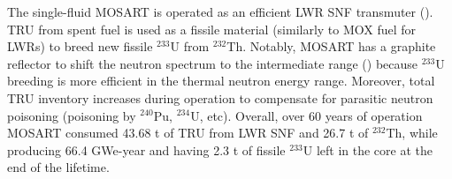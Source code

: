 \documentclass[letterpaper]{mandc2019}
\begin{document}
The single-fluid \gls{MOSART} is operated as an efficient \gls{LWR} \gls{SNF} transmuter (). 
TRU from spent fuel is used as a fissile material (similarly to \gls{MOX} fuel for \gls{LWR}s) to breed new fissile $^{233}$U from $^{232}$Th. 
Notably, \gls{MOSART} has a graphite reflector to shift the neutron spectrum to the  intermediate range () because $^{233}$U breeding is more efficient in the thermal neutron energy range. 
Moreover, total TRU inventory increases  during operation to compensate for parasitic neutron poisoning (poisoning by $^{240}$Pu, $^{234}$U, etc). 
Overall, over 60 years of operation \gls{MOSART} consumed 43.68 t of TRU from \gls{LWR} \gls{SNF} and 26.7 t of $^{232}$Th, while producing 66.4 GWe-year and having 2.3 t of fissile $^{233}$U left in the core at the end of the lifetime.
\end{document}
